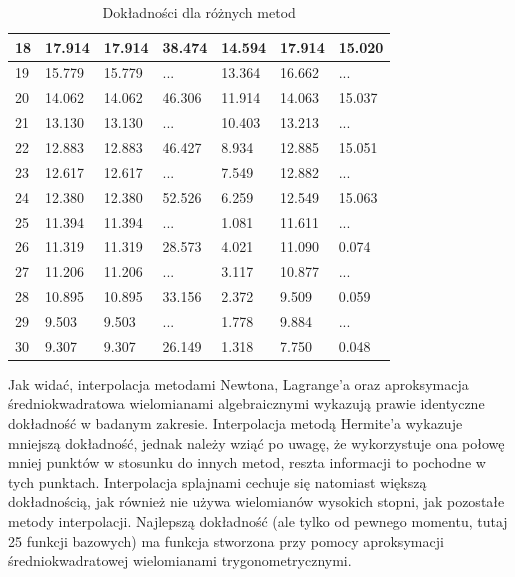 \documentclass{article}
\begin{document}
\begin{table}[H]
\begin{tabular}{|l|l|l|l|l|l|l|}
    18 &  17.914      &   17.914       &   38.474      &  14.594       &   17.914          &  15.020            \\ \hline
    19 &  15.779      &   15.779       &    ...     &  13.364       &    16.662         &   ...           \\ \hline
    20 &  14.062      &    14.062      &   46.306      &  11.914       &    14.063         &  15.037            \\ \hline
    21 &  13.130      &    13.130      &   ...      &  10.403       &    13.213         &    ...          \\ \hline
    22 &  12.883     &    12.883      &  46.427       &  8.934       &    12.885         &   15.051           \\ \hline
    23 &  12.617      &   12.617       &    ...     &  7.549       &    12.882         &    ...          \\ \hline
    24 &  12.380      &   12.380       &   52.526      & 6.259        &   12.549          &   15.063           \\ \hline
    25 &  11.394      &   11.394       &    ...     &  1.081       &   11.611          &    ...          \\ \hline
    26 &  11.319      &   11.319       &   28.573      &  4.021       &   11.090          &   0.074           \\ \hline
    27 &  11.206      &   11.206       &    ...     &  3.117       &   10.877          &    ...          \\ \hline
    28 &  10.895      &  10.895        &  33.156       &  2.372       &   9.509          &    0.059          \\ \hline
    29 &  9.503      &   9.503       &    ...     &   1.778      &   9.884          &      ...        \\ \hline
    30 &  9.307      &    9.307      &  26.149       &  1.318       &   7.750          &    0.048          \\ \hline
    \end{tabular}
    \caption{Dokładności dla różnych metod}
\end{table}

Jak widać, interpolacja metodami Newtona, Lagrange'a oraz aproksymacja średniokwadratowa wielomianami algebraicznymi wykazują
prawie identyczne dokładność w badanym zakresie. Interpolacja metodą Hermite'a wykazuje mniejszą dokładność, jednak należy 
wziąć po uwagę, że wykorzystuje ona połowę mniej punktów w stosunku do innych metod, reszta informacji to pochodne w tych punktach.
Interpolacja splajnami cechuje się natomiast większą dokładnością, jak również nie używa wielomianów wysokich stopni, jak pozostałe
metody interpolacji. Najlepszą dokładność (ale tylko od pewnego momentu, tutaj 25 funkcji bazowych) ma funkcja stworzona przy pomocy
aproksymacji średniokwadratowej wielomianami trygonometrycznymi. 
\end{document}
